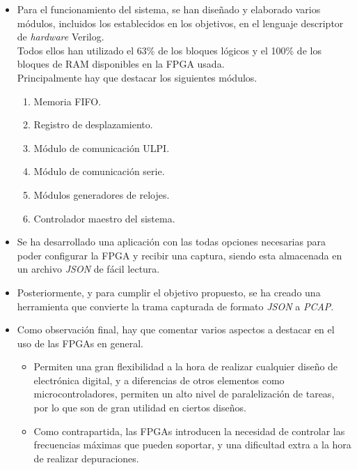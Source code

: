 \begin{itemize}
    \item Para el funcionamiento del sistema, se han diseñado y elaborado varios módulos, incluidos los establecidos en los objetivos, en el lenguaje descriptor de \emph{hardware} Verilog. \\
    Todos ellos han utilizado el 63\% de los bloques lógicos y el 100\% de los bloques de RAM disponibles en la FPGA usada. \\
    Principalmente hay que destacar los siguientes módulos.
    \begin{enumerate}
        \item Memoria FIFO.
        \item Registro de desplazamiento.
        \item Módulo de comunicación ULPI.
        \item Módulo de comunicación serie.
        \item Módulos generadores de relojes.
        \item Controlador maestro del sistema.
    \end{enumerate}

    \item Se ha desarrollado una aplicación con las todas opciones necesarias para poder configurar la FPGA y recibir una captura, siendo esta almacenada en un archivo \emph{JSON} de fácil lectura.
    
    \item Posteriormente, y para cumplir el objetivo propuesto, se ha creado una herramienta que convierte la trama capturada de formato \emph{JSON} a \emph{PCAP}.
    
    \item Como observación final, hay que comentar varios aspectos a destacar en el uso de las FPGAs en general.
    \begin{itemize}
        \item Permiten una gran flexibilidad a la hora de realizar cualquier diseño de electrónica digital, y a diferencias de otros elementos como microcontroladores, permiten un alto nivel de paralelización de tareas, por lo que son de gran utilidad en ciertos diseños.
        
        \item Como contrapartida, las FPGAs introducen la necesidad de controlar las frecuencias máximas que pueden soportar, y una dificultad extra a la hora de realizar depuraciones.
    \end{itemize}
\end{itemize}


